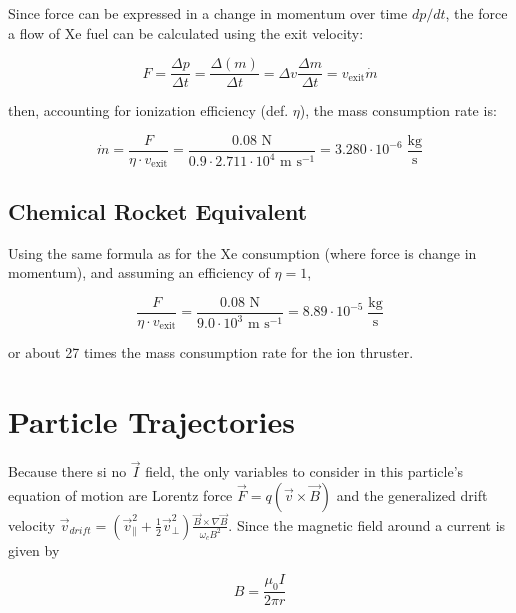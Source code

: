 \documentclass{template}
\begin{document}
Since force can be expressed in a change in momentum over time $dp/dt$, the force a flow of Xe fuel can be calculated using the exit velocity:

\begin{equation}
    F = \frac{\Delta p}{\Delta t} = \frac{\Delta (m)}{\Delta t} = \Delta v \frac{\Delta m}{\Delta t} = v_{\text{exit}} \dot{m}
\end{equation}

then, accounting for ionization efficiency (def. $\eta$), the mass consumption rate is:

\begin{equation}
    \boxed{\dot{m} = \frac{F}{\eta \cdot v_{\text{exit}} } = \frac{0.08\text{ N}}{0.9 \cdot 2.711 \cdot 10^4 \text{ m s}^{-1}} = 3.280 \cdot 10^{-6} \; \frac{\text{kg}}{\text{s}}}
\end{equation}


\subsection{Chemical Rocket Equivalent}

Using the same formula as for the Xe consumption (where force is change in momentum), and assuming an efficiency of $\eta = 1$,

\begin{equation}
    \boxed{\frac{F}{\eta \cdot v_{\text{exit}} } = \frac{0.08\text{ N}}{9.0 \cdot 10^3 \text{ m s}^{-1}} = 8.89 \cdot 10^{-5} \; \frac{\text{kg}}{\text{s}}}
\end{equation}

or about 27 times the mass consumption rate for the ion thruster.

\section{Particle Trajectories}

Because there si no $\vec{I}$ field, the only variables to consider in this particle's equation of motion are Lorentz force $\vec{F} = q\left(\vec{v}\times\vec{B}\right)$ and the generalized drift velocity $\vec{v}_{drift} = \left(  \vec{v}_\parallel^2  + \frac{1}{2} \vec{v}_\perp^2 \right) \frac{\vec{B}\times\nabla\vec{B}}{\omega_c B^2}$. Since the magnetic field around a current is given by

\begin{equation}
    B = \frac{\mu_0 I}{2\pi r}
\end{equation}
\end{document}
